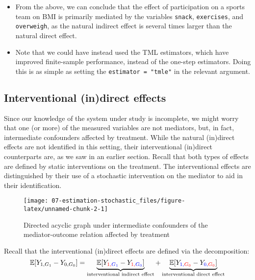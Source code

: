 \documentclass[
  12pt,
]{book}
\newcommand{\passthrough}[1]{#1}
\providecommand{\tightlist}{%
  \setlength{\itemsep}{0pt}\setlength{\parskip}{0pt}}
\theoremstyle{definition}
\theoremstyle{definition}
\theoremstyle{definition}
\newcommand{\E}{\mathbb{E}}
\newcommand{\1}{\mathbbm{1}}
\begin{document}
\begin{itemize}
\tightlist
\item
  From the above, we can conclude that the effect of participation on a sports
  team on BMI is primarily mediated by the variables \passthrough{\lstinline!snack!}, \passthrough{\lstinline!exercises!}, and
  \passthrough{\lstinline!overweigh!}, as the natural indirect effect is several times larger than the
  natural direct effect.
\item
  Note that we could have instead used the TML estimators, which have improved
  finite-sample performance, instead of the one-step estimators. Doing this is
  as simple as setting the \passthrough{\lstinline!estimator = "tmle"!} in the relevant argument.
\end{itemize}

\hypertarget{interventional-indirect-effects-1}{%
\subsection{Interventional (in)direct effects}\label{interventional-indirect-effects-1}}

Since our knowledge of the system under study is incomplete, we might worry that
one (or more) of the measured variables are not mediators, but, in fact,
intermediate confounders affected by treatment. While the natural (in)direct
effects are not identified in this setting, their interventional (in)direct
counterparts are, as we saw in an earlier section. Recall that both types of
effects are defined by static interventions on the treatment. The interventional
effects are distinguished by their use of a stochastic intervention on the
mediator to aid in their identification.

\begin{figure}
  
  {\centering \texttt{[image: 07-estimation-stochastic\_files/figure-latex/unnamed-chunk-2-1]} 
  
  }
  
  \caption{Directed acyclic graph under intermediate confounders of the mediator-outcome relation affected by treatment}\label{fig:unnamed-chunk-2}
  \end{figure}

Recall that the interventional (in)direct effects are defined via the decomposition:
\begin{equation*}
\E[Y_{1,G_1} - Y_{0,G_0}] = \underbrace{\E[Y_{\color{red}{1},\color{blue}{G_1}} -
    Y_{\color{red}{1},\color{blue}{G_0}}]}_{\text{interventional indirect effect}} +
    \underbrace{\E[Y_{\color{blue}{1},\color{red}{G_0}} -
    Y_{\color{blue}{0},\color{red}{G_0}}]}_{\text{interventional direct effect}}
\end{equation*}
\end{document}
